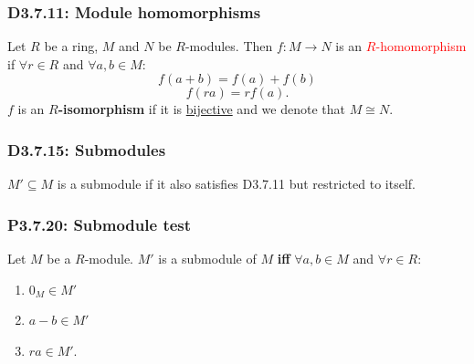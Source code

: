 \documentclass{article}
\begin{document}
\begin{multicols*}{3}
\subsubsection*{D3.7.11: Module homomorphisms}
Let $R$ be a ring, $M$ and $N$ be $R$-modules. Then
$f:M\rightarrow N$ is an \textcolor{red}{$R$-homomorphism}
if $\forall r\in R$ and $\forall a,b\in M$:
$$f(a+b)=f(a)+f(b)$$
$$f(ra)=rf(a).$$
$f$ is an \textbf{$R$-isomorphism} if it is \underline{bijective}
and we denote that $M\cong N$.

\subsubsection*{D3.7.15: Submodules}
$M'\subseteq M$ is a submodule if it also satisfies D3.7.11
but restricted to itself.

\subsubsection*{P3.7.20: Submodule test}
Let $M$ be a $R$-module. $M'$ is a submodule of 
$M$ \textbf{if{}f} $\forall a,b\in M$ and $\forall r\in R$:
\begin{enumerate}
    \item $0_M\in M'$
    \item $a-b\in M'$
    \item $ra\in M'$.
\end{enumerate}

\end{multicols*}
\end{document}
